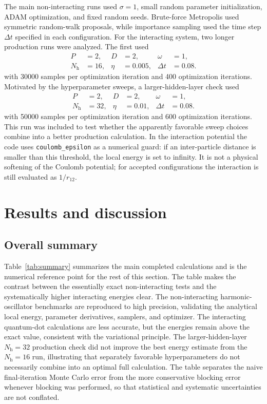 \documentclass[10pt,a4paper]{article}
\newcommand{\Nh}{N_{\mathrm{h}}}
\newcommand{\code}[1]{\texttt{#1}}
\begin{document}
The main non-interacting runs used $\sigma=1$, small random parameter initialization, ADAM optimization, and fixed random seeds. Brute-force Metropolis used symmetric random-walk proposals, while importance sampling used the time step $\Delta t$ specified in each configuration. For the interacting system, two longer production runs were analyzed. The first used
\begin{equation}
\begin{aligned}
P&=2, & D&=2, & \omega&=1,\\
\Nh&=16, & \eta&=0.005, & \Delta t&=0.08 .
\end{aligned}
\end{equation}
with 30000 samples per optimization iteration and 400 optimization iterations. Motivated by the hyperparameter sweeps, a larger-hidden-layer check used
\begin{equation}
\begin{aligned}
P&=2, & D&=2, & \omega&=1,\\
\Nh&=32, & \eta&=0.01, & \Delta t&=0.08 .
\end{aligned}
\end{equation}
with 50000 samples per optimization iteration and 600 optimization iterations. This run was included to test whether the apparently favorable sweep choices combine into a better production calculation. In the interaction potential the code uses \code{coulomb\_epsilon} as a numerical guard: if an inter-particle distance is smaller than this threshold, the local energy is set to infinity. It is not a physical softening of the Coulomb potential; for accepted configurations the interaction is still evaluated as $1/r_{12}$.

\section{Results and discussion}\label{sec:results}

\subsection{Overall summary}

Table~\ref{tab:summary} summarizes the main completed calculations and is the numerical reference point for the rest of this section. The table makes the contrast between the essentially exact non-interacting tests and the systematically higher interacting energies clear. The non-interacting harmonic-oscillator benchmarks are reproduced to high precision, validating the analytical local energy, parameter derivatives, samplers, and optimizer. The interacting quantum-dot calculations are less accurate, but the energies remain above the exact value, consistent with the variational principle. The larger-hidden-layer $\Nh=32$ production check did not improve the best energy estimate from the $\Nh=16$ run, illustrating that separately favorable hyperparameters do not necessarily combine into an optimal full calculation. The table separates the naive final-iteration Monte Carlo error from the more conservative blocking error whenever blocking was performed, so that statistical and systematic uncertainties are not conflated.
\end{document}
